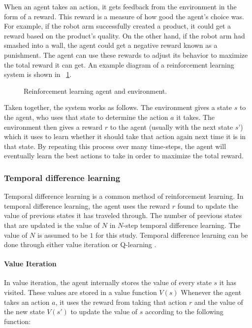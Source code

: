 \documentclass[letterpaper]{article} %
\begin{document}
When an agent takes an action, it gets feedback from the environment in the form of a reward. This reward is a measure of how good the agent’s choice was. For example, if the robot arm successfully created a product, it could get a reward based on the product’s quality. On the other hand, if the robot arm had smashed into a wall, the agent could get a negative reward known as a punishment. The agent can use these rewards to adjust its behavior to maximize the total reward it can get. An example diagram of a reinforcement learning system is shown in \figurename~\ref{fig:RLagent}.

\begin{figure}
	\begin{center}
		\resizebox{\columnwidth}{!}{}
	\end{center}
	\caption{Reinforcement learning agent and environment.}
	\label{fig:RLagent}
\end{figure}




Taken together, the system works as follows. The environment gives a state $s$ to the agent, who uses that state to determine the action $a$ it takes. The environment then gives a reward $r$ to the agent (usually with the next state $s’$) which it uses to learn whether it should take that action again next time it is in that state. By repeating this process over many time-steps, the agent will eventually learn the best actions to take in order to maximize the total reward.

\subsubsection{Temporal difference learning}
Temporal difference learning is a common method of reinforcement learning. In temporal difference learning, the agent uses the reward $r$ found to update the value of previous states it has traveled through. The number of previous states that are updated is the value of $N$ in $N$-step temporal difference learning. The value of $N$ is assumed to be $1$ for this study. Temporal difference learning can be done through either value iteration or Q-learning \cite{Sutton1998}\cite{Ladosz_2022}.
\paragraph{Value Iteration}
In value iteration, the agent internally stores the value of every state $s$ it has visited. These values are stored in a value function $V(s)$ Whenever the agent takes an action $a$, it uses the reward from taking that action $r$ and the value of the new state $V(s')$ to update the value of $s$ according to the following function:
\end{document}
